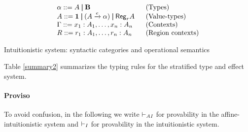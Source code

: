 \documentclass[11pt]{article}
\newcommand{\behtype}{{\bf B}}
\newcommand{\act}[1]{\xrightarrow{#1}}
\newcommand{\regtype}[2]{{\sf Reg}_{#1} #2}
\begin{document}
\begin{table}
{\[\begin{array}{ll}
\alpha::= A \Alt \behtype       &\mbox{(Types)} \\

A::= \tertype \Alt  (A \act{e} \alpha) \Alt \regtype{r}{A} 
&\mbox{(Value-types)} \\

\Gamma::= x_1:A_1,\ldots,x_n:A_n
&\mbox{(Contexts)} \\

R::= r_1:A_1,\ldots,r_n:A_n \quad &\mbox{(Region contexts)} 

\end{array}
\]}
\caption{Intuitionistic system: syntactic categories and operational semantics}\label{summary1}
\end{table}


Table \ref{summary2} summarizes the typing rules for the 
stratified type and effect system.

\paragraph{Proviso}
To avoid confusion, in the following we write $\vdash_{{\it AI}}$ for provability 
in the affine-intuitionistic system and $\vdash_{I}$ for provability
in the intuitionistic system. \\
\end{document}
